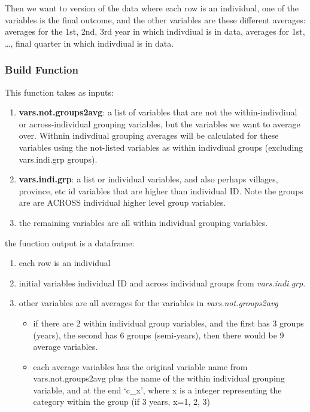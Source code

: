 \documentclass[
]{book}
\providecommand{\tightlist}{%
  \setlength{\itemsep}{0pt}\setlength{\parskip}{0pt}}
\begin{document}
Then we want to version of the data where each row is an individual, one of the variables is the final outcome, and the other variables are these different averages: averages for the 1st, 2nd, 3rd year in which indivdiual is in data, averages for 1st, \ldots, final quarter in which indivdiual is in data.

\hypertarget{build-function}{%
\subsubsection{Build Function}\label{build-function}}

This function takes as inputs:

\begin{enumerate}
\def\labelenumi{\arabic{enumi}.}
\tightlist
\item
  \textbf{vars.not.groups2avg}: a list of variables that are not the within-indivdiual or across-individual grouping variables, but the variables we want to average over. Withnin indivdiual grouping averages will be calculated for these variables using the not-listed variables as within indivdiual groups (excluding vars.indi.grp groups).
\item
  \textbf{vars.indi.grp}: a list or individual variables, and also perhaps villages, province, etc id variables that are higher than individual ID. Note the groups are are ACROSS individual higher level group variables.
\item
  the remaining variables are all within individual grouping variables.
\end{enumerate}

the function output is a dataframe:

\begin{enumerate}
\def\labelenumi{\arabic{enumi}.}
\tightlist
\item
  each row is an individual
\item
  initial variables individual ID and across individual groups from \emph{vars.indi.grp}.
\item
  other variables are all averages for the variables in \emph{vars.not.groups2avg}

  \begin{itemize}
  \tightlist
  \item
    if there are 2 within individual group variables, and the first has 3 groups (years), the second has 6 groups (semi-years), then there would be 9 average variables.
  \item
    each average variables has the original variable name from vars.not.groups2avg plus the name of the within individual grouping variable, and at the end `c\_x', where x is a integer representing the category within the group (if 3 years, x=1, 2, 3)
  \end{itemize}
\end{enumerate}
\end{document}
